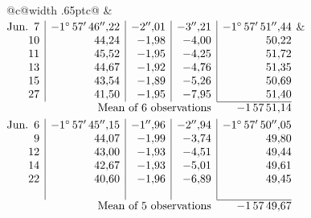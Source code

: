 \noindent\begin{tabular}{@{}c@{\hspace{.4em}\vrule width .65pt\hspace{.4em}}c@{}}
 &
 \\[.18ex]
\(\begin{array}[t]{@{}r|r|r|r|r@{}}
\text{Jun.}\enspace 7 & -1^\circ\,57'\,46''{,}22 & -2''{,}01 & -3''{,}21 & -1^\circ\,57'\,51''{,}44\\
10 & 44{,}24 & -1{,}98 & -4{,}00 & 50{,}22\\
11 & 45{,}52 & -1{,}95 & -4{,}25 & 51{,}72\\
13 & 44{,}67 & -1{,}92 & -4{,}76 & 51{,}35\\
15 & 43{,}54 & -1{,}89 & -5{,}26 & 50{,}69\\
27 & 41{,}50 & -1{,}95 & -7{,}95 & 51{,}40\\
\cline{5-5}
\multicolumn{4}{r}{\text{Mean of 6 observations}} & -1\,57\,51{,}14
\end{array}\)
&
\(\begin{array}[t]{@{}r|r|r|r|r@{}}
\text{Jun.}\enspace 6 & -1^\circ\,57'\,45''{,}15 & -1''{,}96 & -2''{,}94 & -1^\circ\,57'\,50''{,}05\\
9 & 44{,}07 & -1{,}99 & -3{,}74 & 49{,}80\\
12 & 43{,}00 & -1{,}93 & -4{,}51 & 49{,}44\\
14 & 42{,}67 & -1{,}93 & -5{,}01 & 49{,}61\\
22 & 40{,}60 & -1{,}96 & -6{,}89 & 49{,}45\\
 & & & & \\
\cline{5-5}
\multicolumn{4}{r}{\text{Mean of 5 observations}} & -1\,57\,49{,}67
\end{array}\)
\end{tabular}\par\medskip
{}
